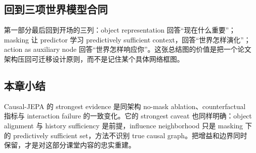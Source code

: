 \subsection{回到三项世界模型合同}

第一部分最后回到开场的三列：object representation 回答``现在什么重要''；masking 让 predictor 学习 predictively sufficient context，回答``世界怎样演化''；action as auxiliary node 回答``世界怎样响应你''。这张总结图的价值是把一个论文架构压回可迁移设计原则，而不是记住某个具体网络框图。



\subsection{本章小结}

Causal-JEPA 的 strongest evidence 是同架构 no-mask ablation、counterfactual 指标与 interaction failure 的一致变化。它的 strongest caveat 也同样明确：object alignment 与 history sufficiency 是前提，influence neighborhood 只是 masking 下的 predictively sufficient set，方法不识别 true causal graph。把增益和边界同时保留，才是对这部分课堂内容的忠实重建。

